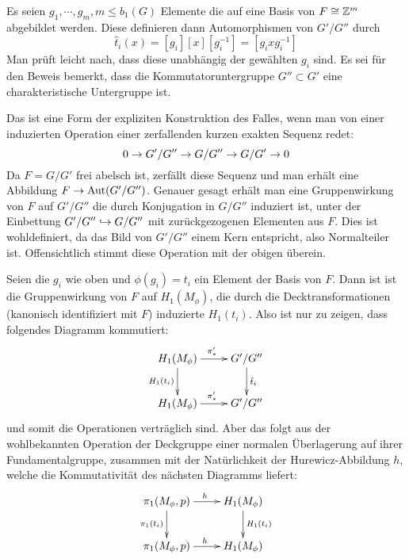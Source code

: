 Es seien $g_1,\cdots,g_m,m\leq b_1(G)$ Elemente die auf eine Basis von $F\cong \mathbb{Z}^m$ abgebildet werden. Diese definieren dann Automorphismen von $G'/G''$ durch 
\[
	\hat t_i(x) =  [g_i]  [x][ g_i^{-1}] = [ g_i x g_i^{-1}]
\]
Man prüft leicht nach, dass diese unabhängig der gewählten $g_i$ sind. Es sei für den Beweis bemerkt, dass die Kommutatoruntergruppe $G''\subset G'$ eine charakteristische Untergruppe ist. 
\begin{bem}
\label{bem:gruppenwirkungexactsequence}
 	Das ist eine Form der expliziten Konstruktion des Falles, wenn man von einer induzierten Operation einer zerfallenden kurzen exakten Sequenz redet:
 	\[
 		0\to G'/G''\to G/G''\to G/G'\to0
 	\]
 	Da $F= G/G'$ frei abelsch ist, zerfällt diese Sequenz und man erhält eine Abbildung $F \to \operatorname{Aut}(G'/G'')$. Genauer gesagt erhält man eine Gruppenwirkung von $F$ auf $G'/G''$ die durch Konjugation in $G/G''$ induziert ist, unter der Einbettung $G'/G''\hookrightarrow G/G''$ mit zurückgezogenen Elementen aus $F$. Dies ist wohldefiniert, da das Bild von $G'/G''$ einem Kern entspricht, also Normalteiler ist. Offensichtlich stimmt diese Operation mit der obigen überein.
 \end{bem} 
 
 Seien die $g_i$ wie oben und $\phi(g_i)=t_i$ ein Element der Basis von $F$. Dann ist ist die Gruppenwirkung von $F$ auf $H_1(M_\phi)$, die durch die Decktransformationen (kanonisch identifiziert mit $F$) induzierte $H_1(t_i)$. Also ist nur zu zeigen, dass folgendes Diagramm kommutiert:
\[
	\begin{xy}
		\xymatrix{H_1(M_\phi) \ar[d]_{H_1(t_i)} \ar[r]^{\pi'_*} & G'/G'' \ar[d]^{\hat t_i}\\
		H_1(M_\phi)  \ar[r]^{\pi'_*} & G'/G'' }
	\end{xy}
\]
und somit die Operationen verträglich sind. Aber das folgt aus der wohlbekannten Operation der Deckgruppe einer normalen Überlagerung auf ihrer Fundamentalgruppe, zusammen mit der Natürlichkeit der Hurewicz-Abbildung $h$, welche die Kommutativität des nächsten Diagramms liefert:
\[
	\begin{xy}
		\xymatrix{\pi_1(M_\phi,p) \ar[d]_{\pi_1(t_i)} \ar[r]^{h} &H_1(M_\phi) \ar[d]^{H_1(t_i)}\\
		\pi_1(M_\phi,p)  \ar[r]^{h} &H_1(M_\phi)}
	\end{xy}
\]


